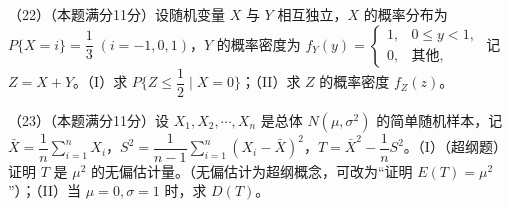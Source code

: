 \documentclass[UTF8,12pt]{ctexart}
\begin{document}
（22）（本题满分11分）设随机变量 \(\displaystyle X\) 与 \(\displaystyle Y\) 相互独立，\(\displaystyle X\) 的概率分布为 \(\displaystyle P\{X=i\}=\dfrac{\displaystyle 1}{\displaystyle 3}\;(i=-1,\allowbreak 0,\allowbreak 1)\)，\(\displaystyle Y\) 的概率密度为 \(\displaystyle f_Y(y)=\begin{cases}1,\allowbreak &0\le y<1,\allowbreak \\0,\allowbreak &\text{其他},\allowbreak \end{cases}\) 记 \(\displaystyle Z=X+Y\)。（I）求 \(\displaystyle P\{Z\le\dfrac{\displaystyle 1}{\displaystyle 2}\mid X=0\}\)；（II）求 \(\displaystyle Z\) 的概率密度 \(\displaystyle f_Z(z)\)。


（23）（本题满分11分）设 \(\displaystyle X_1,\allowbreak X_2,\allowbreak \cdots,\allowbreak X_n\) 是总体 \(\displaystyle N(\mu,\allowbreak \sigma^2)\) 的简单随机样本，记 \(\displaystyle \bar X=\dfrac{\displaystyle 1}{\displaystyle n}\displaystyle \sum_{i=1}^nX_i\)，\(\displaystyle S^2=\dfrac{\displaystyle 1}{\displaystyle n-1}\displaystyle \sum_{i=1}^n(X_i-\bar X)^2\)，\(\displaystyle T=\bar X^2-\dfrac{\displaystyle 1}{\displaystyle n}S^2\)。（I）（超纲题）证明 \(\displaystyle T\) 是 \(\displaystyle \mu^2\) 的无偏估计量。（无偏估计为超纲概念，可改为“证明 \(\displaystyle E(T)=\mu^2\)”）；（II）当 \(\displaystyle \mu=0,\allowbreak \sigma=1\) 时，求 \(\displaystyle D(T)\)。
\end{document}
